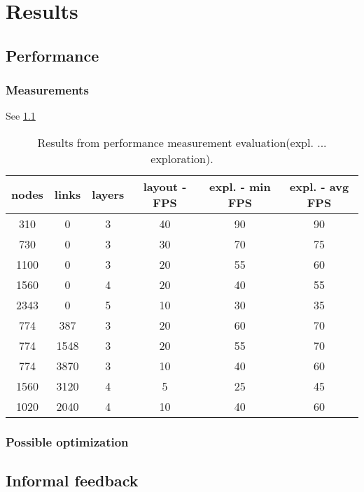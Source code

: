 \chapter{Results}

\section{Performance}

\subsection{Measurements}

See \ref{table:resultFPS}

\begin{table}
    \centering
    \begin{tabular}{ | c | c | c | c | c | c | }
        \hline
        \textbf{nodes} & \textbf{links} &\textbf{layers} &\textbf{layout - FPS} &\textbf{expl. - min FPS} &\textbf{expl. - avg FPS}\\
        \hline
        310  & 0    & 3 & 40 & 90 & 90\\ \hline
        730  & 0    & 3 & 30 & 70 & 75\\ \hline
        1100 & 0    & 3 & 20 & 55 & 60\\ \hline
        1560 & 0    & 4 & 20 & 40 & 55\\ \hline
        2343 & 0    & 5 & 10 & 30 & 35\\ \hline
        774  & 387  & 3 & 20 & 60 & 70\\ \hline
        774  & 1548 & 3 & 20 & 55 & 70\\ \hline
        774  & 3870 & 3 & 10 & 40 & 60\\ \hline
        1560 & 3120 & 4 & 5  & 25 & 45\\ \hline
        1020 & 2040 & 4 & 10 & 40 & 60\\ \hline
     \end{tabular}
     \caption{Results from performance measurement evaluation(expl. ... exploration).}
     \label{table:resultFPS}
\end{table}

\subsection{Possible optimization}


\section{Informal feedback}

